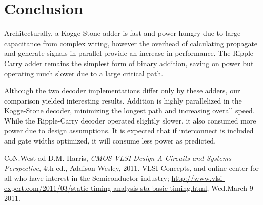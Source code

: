\documentclass[conference]{IEEEtran}
\begin{document}
\section{Conclusion}

Architecturally, a Kogge-Stone adder is fast and power hungry due to large capacitance from complex wiring, however the overhead of calculating propagate and generate signals in parallel provide an increase in performance. The Ripple-Carry adder remains the simplest form of binary addition, saving on power but operating much slower due to a large critical path.

Although the two decoder implementations differ only by these adders, our comparison yielded interesting results. Addition is highly parallelized in the Kogge-Stone decoder, minimizing the longest path and increasing overall speed. While the Ripple-Carry decoder operated slightly slower, it also consumed more power due to design assumptions. It is expected that if interconnect is included and gate widths optimized, it will consume less power as predicted.




\ifCLASSOPTIONcaptionsoff
  \newpage
\fi





%
%
%
\begin{thebibliography}{1}

CoN.West ad D.M. Harris, \emph{CMOS VLSI Design A Circuits and Systems Perspective}, 4th ed., Addison-Wesley, 2011.
VLSI Concepts, and online center for all who have interest in the Semiconductor industry; \url{http://www.vlsi-expert.com/2011/03/static-timing-analysis-sta-basic-timing.html}, Wed.March 9 2011.


\end{thebibliography}
\end{document}

